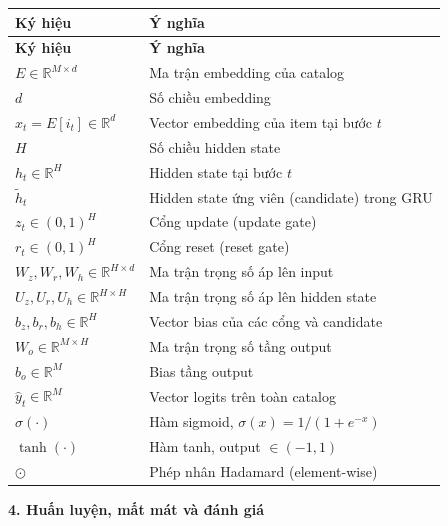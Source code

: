 \documentclass[12pt, a4paper]{article}
\begin{document}
\begin{longtable}{@{}p{4.2cm} p{11cm}@{}}
\toprule
\textbf{Ký hiệu} & \textbf{Ý nghĩa} \\
\midrule
\endfirsthead
\toprule
\textbf{Ký hiệu} & \textbf{Ý nghĩa} \\
\midrule
\endhead
\bottomrule
\endfoot

$E \in \mathbb{R}^{M \times d}$              & Ma trận embedding của catalog \\
$d$                                          & Số chiều embedding \\
$x_t = E[i_t] \in \mathbb{R}^d$              & Vector embedding của item tại bước $t$ \\
$H$                                          & Số chiều hidden state \\
$h_t \in \mathbb{R}^{H}$                     & Hidden state tại bước $t$ \\
$\tilde{h}_t$                                & Hidden state ứng viên (candidate) trong GRU \\
$z_t \in (0,1)^H$                            & Cổng update (update gate) \\
$r_t \in (0,1)^H$                            & Cổng reset (reset gate) \\
$W_z, W_r, W_h \in \mathbb{R}^{H \times d}$  & Ma trận trọng số áp lên input \\
$U_z, U_r, U_h \in \mathbb{R}^{H \times H}$  & Ma trận trọng số áp lên hidden state \\
$b_z, b_r, b_h \in \mathbb{R}^H$             & Vector bias của các cổng và candidate \\
$W_o \in \mathbb{R}^{M \times H}$            & Ma trận trọng số tầng output \\
$b_o \in \mathbb{R}^M$                       & Bias tầng output \\
$\hat{y}_t \in \mathbb{R}^M$                 & Vector logits trên toàn catalog \\
$\sigma(\cdot)$                              & Hàm sigmoid, $\sigma(x) = 1/(1+e^{-x})$ \\
$\tanh(\cdot)$                               & Hàm tanh, output $\in (-1, 1)$ \\
$\odot$                                      & Phép nhân Hadamard (element-wise) \\

\end{longtable}

\textbf{4. Huấn luyện, mất mát và đánh giá}
\end{document}
